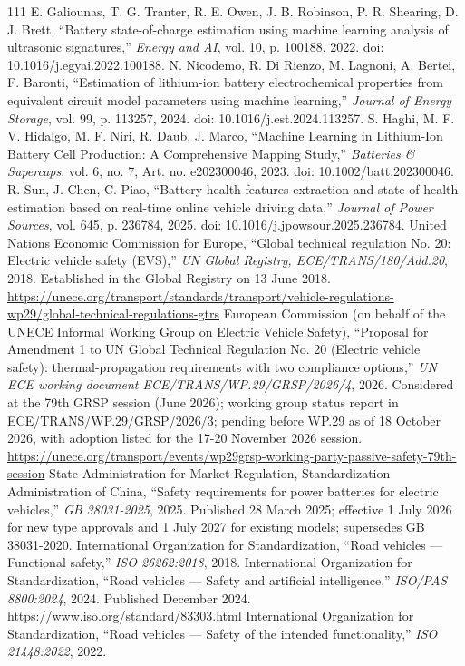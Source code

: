 \documentclass[journal]{IEEEtran}
\begin{document}
\begin{thebibliography}{111}
E. Galiounas, T. G. Tranter, R. E. Owen, J. B. Robinson, P. R. Shearing, D. J. Brett, ``Battery state-of-charge estimation using machine learning analysis of ultrasonic signatures,'' \emph{Energy and AI}, vol. 10, p. 100188, 2022. doi: 10.1016/j.egyai.2022.100188.
N. Nicodemo, R. Di Rienzo, M. Lagnoni, A. Bertei, F. Baronti, ``Estimation of lithium-ion battery electrochemical properties from equivalent circuit model parameters using machine learning,'' \emph{Journal of Energy Storage}, vol. 99, p. 113257, 2024. doi: 10.1016/j.est.2024.113257.
S. Haghi, M. F. V. Hidalgo, M. F. Niri, R. Daub, J. Marco, ``Machine Learning in Lithium‐Ion Battery Cell Production: A Comprehensive Mapping Study,'' \emph{Batteries \& Supercaps}, vol. 6, no. 7, Art. no. e202300046, 2023. doi: 10.1002/batt.202300046.
R. Sun, J. Chen, C. Piao, ``Battery health features extraction and state of health estimation based on real-time online vehicle driving data,'' \emph{Journal of Power Sources}, vol. 645, p. 236784, 2025. doi: 10.1016/j.jpowsour.2025.236784.
United Nations Economic Commission for Europe, ``Global technical regulation No. 20: Electric vehicle safety (EVS),'' \emph{UN Global Registry, ECE/TRANS/180/Add.20}, 2018. Established in the Global Registry on 13 June 2018. \url{https://unece.org/transport/standards/transport/vehicle-regulations-wp29/global-technical-regulations-gtrs}
European Commission (on behalf of the UNECE Informal Working Group on Electric Vehicle Safety), ``Proposal for Amendment 1 to UN Global Technical Regulation No. 20 (Electric vehicle safety): thermal-propagation requirements with two compliance options,'' \emph{UN ECE working document ECE/TRANS/WP.29/GRSP/2026/4}, 2026. Considered at the 79th GRSP session (June 2026); working group status report in ECE/TRANS/WP.29/GRSP/2026/3; pending before WP.29 as of 18 October 2026, with adoption listed for the 17-20 November 2026 session. \url{https://unece.org/transport/events/wp29grsp-working-party-passive-safety-79th-session}
State Administration for Market Regulation, Standardization Administration of China, ``Safety requirements for power batteries for electric vehicles,'' \emph{GB 38031-2025}, 2025. Published 28 March 2025; effective 1 July 2026 for new type approvals and 1 July 2027 for existing models; supersedes GB 38031-2020.
International Organization for Standardization, ``Road vehicles --- Functional safety,'' \emph{ISO 26262:2018}, 2018.
International Organization for Standardization, ``Road vehicles --- Safety and artificial intelligence,'' \emph{ISO/PAS 8800:2024}, 2024. Published December 2024. \url{https://www.iso.org/standard/83303.html}
International Organization for Standardization, ``Road vehicles --- Safety of the intended functionality,'' \emph{ISO 21448:2022}, 2022.
\end{thebibliography}
\end{document}
